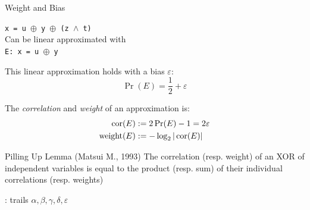 \documentclass[aspectratio=169,10pt,webfont]{beamer}
\begin{document}

\begin{frame}{Weight and Bias}

\begin{center}
\texttt{x = u $\oplus$ y $\oplus$ (z $\land$ t)}\\
Can be linear approximated with\\
\texttt{E: x = u $\oplus$ y}
\end{center}

This linear approximation holds with a bias $\varepsilon$:
$$\Pr(E) = \frac{1}{2} + \varepsilon$$

The {\it correlation} and {\it weight} of an approximation is:
\begin{align*}
\operatorname{cor}(E) &:= 2\Pr(E)-1 = 2 \varepsilon\\
\operatorname{weight}(E) &:= -\log_2|\operatorname{cor}(E)|
\end{align*}

\begin{alertblock}{Pilling Up Lemma (Matsui M., 1993)}
  The correlation (resp. weight) of an XOR of independent variables is equal to
  the product (resp. sum) of their individual correlations (resp. weights)
\end{alertblock}

\end{frame}


\begin{frame}{\MiniMORUS : trails $\alpha, \beta, \gamma, \delta, \varepsilon$}

  \begin{figure}
    \substatesfalse
    \rotwfalse
    \statesfalse
    \messagefalse

    \resizebox{!}{0.78\textheight}{%
    
    }
    \resizebox{!}{0.78\textheight}{%
    
    }
    \resizebox{!}{0.78\textheight}{%
    
    }
    \resizebox{!}{0.78\textheight}{%
    
    }
    \resizebox{!}{0.78\textheight}{%
    
    }
  \end{figure}

\end{frame}
\end{document}
